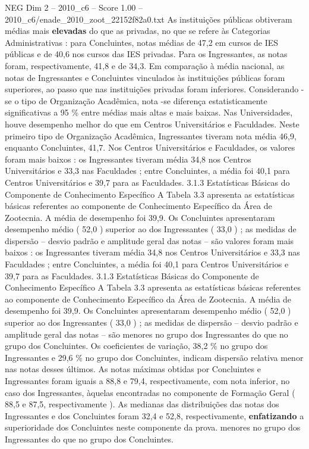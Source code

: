 \begin{textsample}{NEG Dim 2 – 2010\_c6 – Score 1.00 – 2010\_c6/enade\_2010\_zoot\_22152f82a0.txt}
As instituições públicas obtiveram médias mais \textbf{elevadas} do que as privadas, no que se refere às Categorias Administrativas : para Concluintes, notas médias de 47,2 em cursos de IES públicas e de 40,6 nos cursos das IES privadas.
Para os Ingressantes, as notas foram, respectivamente, 41,8 e de 34,3.
Em comparação à média nacional, as notas de Ingressantes e Concluintes vinculados às instituições públicas foram superiores, ao passo que nas instituições privadas foram inferiores.
Considerando -se o tipo de Organização Acadêmica, nota -se diferença estatisticamente significativas a 95 \% entre médias mais altas e mais baixas.
Nas Universidades, houve desempenho melhor do que em Centros Universitários e Faculdades.
Neste primeiro tipo de Organização Acadêmica, Ingressantes tiveram nota média 46,9, enquanto Concluintes, 41,7.
Nos Centros Universitários e Faculdades, os valores foram mais baixos : os Ingressantes tiveram média 34,8 nos Centros Universitários e 33,3 nas Faculdades ; entre Concluintes, a média foi 40,1 para Centros Universitários e 39,7 para as Faculdades. 3.1.3 Estatísticas Básicas do Componente de Conhecimento Específico A Tabela 3.3 apresenta as estatísticas básicas referentes ao componente de Conhecimento Específico da Área de Zootecnia.
A média de desempenho foi 39,9.
Os Concluintes apresentaram desempenho médio ( 52,0 ) superior ao dos Ingressantes ( 33,0 ) ; as medidas de dispersão – desvio padrão e amplitude geral das notas – são valores foram mais baixos : os Ingressantes tiveram média 34,8 nos Centros Universitários e 33,3 nas Faculdades ; entre Concluintes, a média foi 40,1 para Centros Universitários e 39,7 para as Faculdades. 3.1.3 Estatísticas Básicas do Componente de Conhecimento Específico A Tabela 3.3 apresenta as estatísticas básicas referentes ao componente de Conhecimento Específico da Área de Zootecnia.
A média de desempenho foi 39,9.
Os Concluintes apresentaram desempenho médio ( 52,0 ) superior ao dos Ingressantes ( 33,0 ) ; as medidas de dispersão – desvio padrão e amplitude geral das notas – são menores no grupo dos Ingressantes do que no grupo dos Concluintes.
Os coeficientes de variação, 38,2 \% no grupo dos Ingressantes e 29,6 \% no grupo dos Concluintes, indicam dispersão relativa menor nas notas desses últimos.
As notas máximas obtidas por Concluintes e Ingressantes foram iguais a 88,8 e 79,4, respectivamente, com nota inferior, no caso dos Ingressantes, àquelas encontradas no componente de Formação Geral ( 88,5 e 87,5, respectivamente ).
As medianas das distribuições das notas dos Ingressantes e dos Concluintes foram 32,4 e 52,8, respectivamente, \textbf{enfatizando} a superioridade dos Concluintes neste componente da prova. menores no grupo dos Ingressantes do que no grupo dos Concluintes.

\end{textsample}
